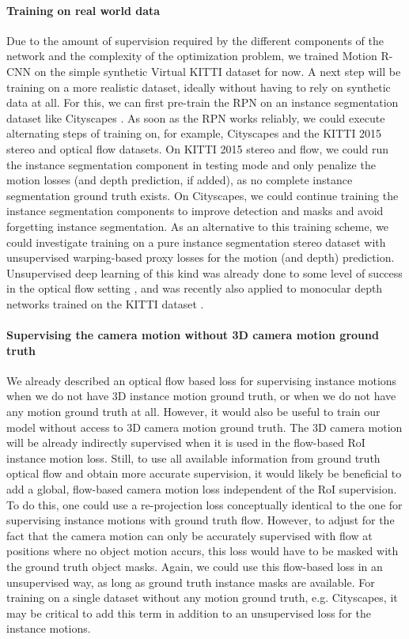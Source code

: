 \paragraph{Training on real world data}
Due to the amount of supervision required by the different components of the network
and the complexity of the optimization problem,
we trained Motion R-CNN on the simple synthetic Virtual KITTI dataset for now.
A next step will be training on a more realistic dataset,
ideally without having to rely on synthetic data at all.
For this, we can first pre-train the RPN on an instance segmentation dataset like
Cityscapes \cite{Cityscapes}. As soon as the RPN works reliably, we could execute alternating
steps of training on, for example, Cityscapes and the KITTI 2015 stereo and optical flow datasets.
On KITTI 2015 stereo and flow, we could run the instance segmentation component in testing mode and only penalize
the motion losses (and depth prediction, if added), as no complete instance segmentation ground truth exists.
On Cityscapes, we could continue training the instance segmentation components to
improve detection and masks and avoid forgetting instance segmentation.
As an alternative to this training scheme, we could investigate training on a pure
instance segmentation stereo dataset with unsupervised warping-based proxy losses for the motion (and depth)
prediction. Unsupervised deep learning of this kind was already done to some level of success in the optical flow
setting \cite{UnsupFlownet, UnFlow},
and was recently also applied to monocular depth networks trained on the KITTI dataset \cite{UnsupDepth}.

\paragraph{Supervising the camera motion without 3D camera motion ground truth}
We already described an optical flow based loss for supervising instance motions
when we do not have 3D instance motion ground truth, or when we do not have
any motion ground truth at all.
However, it would also be useful to train our model without access to 3D camera
motion ground truth.
The 3D camera motion will be already indirectly supervised when it is used in the flow-based
RoI instance motion loss. Still, to use all available information from
ground truth optical flow and obtain more accurate supervision,
it would likely be beneficial to add a global, flow-based camera motion loss
independent of the RoI supervision.
To do this, one could use a re-projection loss conceptually identical to the one
for supervising instance motions with ground truth flow. However, to adjust for the
fact that the camera motion can only be accurately supervised with flow at positions where
no object motion accurs, this loss would have to be masked with the ground truth
object masks. Again, we could use this flow-based loss in an unsupervised way,
as long as ground truth instance masks are available.
For training on a single dataset without any motion ground truth, e.g.
Cityscapes, it may be critical to add this term in addition to an unsupervised
loss for the instance motions.

